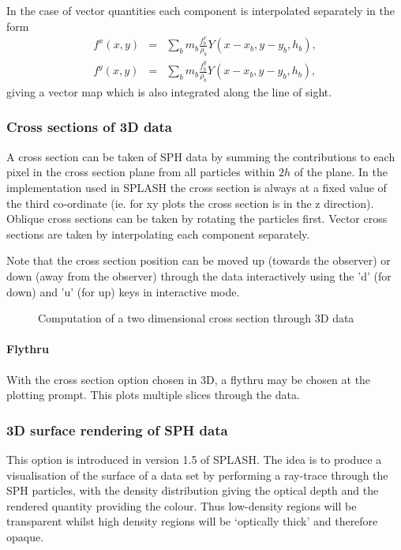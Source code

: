 \documentclass[a4paper,11pt]{article}
\begin{document}
In the case of vector quantities each component is interpolated separately in the form
\begin{eqnarray}
f^x(x,y) & = & \sum_b m_b \frac{f^x_b}{\rho_b} Y(x - x_b, y-y_b, h_b), \nonumber \\
f^y(x,y) & = & \sum_b m_b \frac{f^y_b}{\rho_b} Y(x - x_b, y-y_b, h_b),
\end{eqnarray}
giving a vector map which is also integrated along the line of
sight.

\subsubsection{Cross sections of 3D data}
 A cross section can be taken of SPH data by summing the
contributions to each pixel in the cross section plane from all particles within
$2h$ of the plane. In
the implementation used in SPLASH the cross section is always at a fixed value of the third co-ordinate
(ie. for xy plots the cross section is in the z direction). Oblique cross
sections can be taken by rotating the particles first. Vector cross sections are taken by
interpolating each component separately.

 Note that the cross section position can be moved up (towards the observer) or down (away from the
 observer) through the data interactively using
the 'd' (for down) and 'u' (for up) keys in interactive mode.

\begin{figure}
\begin{center}
\caption{Computation of a two dimensional cross section through 3D data}
\label{fig:xsec3D}
\end{center}
\end{figure}

\paragraph{Flythru}
 With the cross section option chosen in 3D, a flythru may be chosen at the plotting prompt. This
plots multiple slices through the data.


\subsubsection{3D surface rendering of SPH data}
 This option is introduced in version 1.5 of SPLASH. The idea is to produce a visualisation of
the surface of a data set by performing a ray-trace through the SPH particles, with the density
distribution giving the optical depth and the rendered quantity providing the colour. Thus
low-density regions will be transparent whilst high density regions will be `optically thick' and
therefore opaque. 
\end{document}
